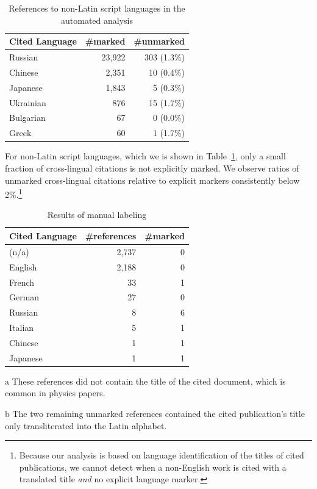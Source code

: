 \begin{table}
\caption{References to non-Latin script languages in the automated analysis}
 \label{tab:automatedresults}
  \centering
  \begin{small}
 \begin{threeparttable}
 \begin{tabular}{lrr}
 \toprule
   Cited Language & \#marked & \#unmarked \\
   \midrule
   Russian & 23,922 & 303 (1.3\%)\\
   Chinese & 2,351 & 10 (0.4\%) \\
   Japanese & 1,843 & 5 (0.3\%) \\
   Ukrainian & 876 & 15 (1.7\%)\\
   Bulgarian & 67 & 0 (0.0\%)\\
   Greek & 60 & 1 (1.7\%) \\
   \bottomrule
 \end{tabular}
\end{threeparttable}
  \end{small}
\end{table}

For non-Latin script languages, which we is shown in Table~\ref{tab:automatedresults}, only a small fraction of cross-lingual citations is not explicitly marked. We observe ratios of unmarked cross-lingual citations relative to explicit markers consistently below 2\%.\footnote{Because our analysis is based on language identification of the titles of cited publications, we cannot detect when a non-English work is cited with a translated title \emph{and} no explicit language marker.}

\begin{table}
\caption{Results of manual labeling}
 \label{tab:manualresults}
  \centering
  \begin{small}
 \begin{threeparttable}
 \begin{tabular}{lrr}
 \toprule
   Cited Language & \#references & \#marked \\
   \midrule
   (n/a)\tnote{a} & 2,737 & 0 \\
   English & 2,188 & 0 \\
   French & 33 & 1 \\
   German & 27 & 0 \\
   Russian & 8 & 6\tnote{b}\\
   Italian & 5 & 1 \\
   Chinese & 1 & 1 \\
   Japanese & 1 & 1 \\
   \bottomrule
 \end{tabular}
 \begin{tablenotes}
    \item[a] These references did not contain the title of the cited document, which is common in physics papers.
    \item[b] The two remaining unmarked references contained the cited publication's title only transliterated into the Latin alphabet.
  \end{tablenotes}
\end{threeparttable}
  \end{small}
\end{table}

